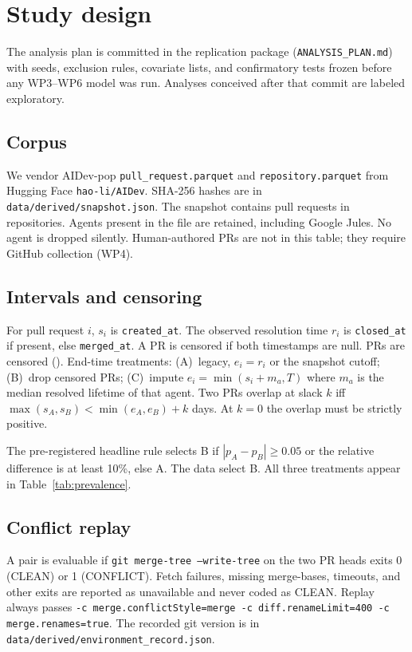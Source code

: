 \documentclass[10pt,conference]{IEEEtran}
\begin{document}
\section{Study design}
\label{sec:design}

The analysis plan is committed in the replication package (\texttt{ANALYSIS\_PLAN.md}) with seeds, exclusion rules, covariate lists, and confirmatory tests frozen before any WP3--WP6 model was run. Analyses conceived after that commit are labeled exploratory.

\subsection{Corpus}
We vendor AIDev-pop \texttt{pull\_request.parquet} and \texttt{repository.parquet} from Hugging Face \texttt{hao-li/AIDev}. SHA-256 hashes are in \texttt{data/derived/snapshot.json}. The snapshot contains \NPopPRs{} pull requests in \NPopRepos{} repositories. Agents present in the file are retained, including Google Jules. No agent is dropped silently. Human-authored PRs are not in this table; they require GitHub collection (WP4).

\subsection{Intervals and censoring}
For pull request $i$, $s_i$ is \texttt{created\_at}. The observed resolution time $r_i$ is \texttt{closed\_at} if present, else \texttt{merged\_at}. A PR is censored if both timestamps are null. \OpenShareFrac{} PRs are censored (\OpenShare). End-time treatments: (A)~legacy, $e_i = r_i$ or the snapshot cutoff; (B)~drop censored PRs; (C)~impute $e_i = \min(s_i + m_a, T)$ where $m_a$ is the median resolved lifetime of that agent. Two PRs overlap at slack $k$ iff $\max(s_A,s_B) < \min(e_A,e_B) + k$ days. At $k{=}0$ the overlap must be strictly positive.

The pre-registered headline rule selects B if $|p_A-p_B|\ge 0.05$ or the relative difference is at least 10\%, else A. The data select B. All three treatments appear in Table~\ref{tab:prevalence}.

\subsection{Conflict replay}
A pair is evaluable if \texttt{git merge-tree --write-tree} on the two PR heads exits 0 (CLEAN) or 1 (CONFLICT). Fetch failures, missing merge-bases, timeouts, and other exits are reported as unavailable and never coded as CLEAN. Replay always passes \texttt{-c merge.conflictStyle=merge -c diff.renameLimit=400 -c merge.renames=true}. The recorded git version is in \texttt{data/derived/environment\_record.json}.
\end{document}
